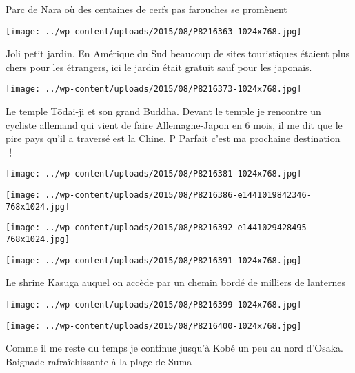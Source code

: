  \newline
 Parc de Nara où des centaines de cerfs pas farouches se promènent \newline
 \newline
\centerline{\texttt{[image: ../wp-content/uploads/2015/08/P8216363-1024x768.jpg]} } 
 \newline
 Joli petit jardin. En Amérique du Sud beaucoup de sites touristiques étaient plus chers pour les étrangers, ici le jardin était gratuit sauf pour les japonais. \newline
 \newline
\centerline{\texttt{[image: ../wp-content/uploads/2015/08/P8216373-1024x768.jpg]} } 
 \newline
 Le temple Tōdai-ji et son grand Buddha. Devant le temple je rencontre un cycliste allemand qui vient de faire Allemagne-Japon en 6 mois, il me dit que le pire pays qu'il a traversé est la Chine. P Parfait c'est ma prochaine destination ！ \newline
 \newline
\centerline{\texttt{[image: ../wp-content/uploads/2015/08/P8216381-1024x768.jpg]} } 
 \newline
 \newline
\centerline{\texttt{[image: ../wp-content/uploads/2015/08/P8216386-e1441019842346-768x1024.jpg]} } 
 \newline
 \newline
\centerline{\texttt{[image: ../wp-content/uploads/2015/08/P8216392-e1441029428495-768x1024.jpg]} } 
 \newline
 \newline
\centerline{\texttt{[image: ../wp-content/uploads/2015/08/P8216391-1024x768.jpg]} } 
 \newline
 Le shrine Kasuga auquel on accède par un chemin bordé de milliers de lanternes \newline
 \newline
\centerline{\texttt{[image: ../wp-content/uploads/2015/08/P8216399-1024x768.jpg]} } 
 \newline
 \newline
\centerline{\texttt{[image: ../wp-content/uploads/2015/08/P8216400-1024x768.jpg]} } 
 \newline
 Comme il me reste du temps je continue jusqu'à Kobé un peu au nord d'Osaka. \newline
 Baignade rafraîchissante à la plage de Suma \newline
